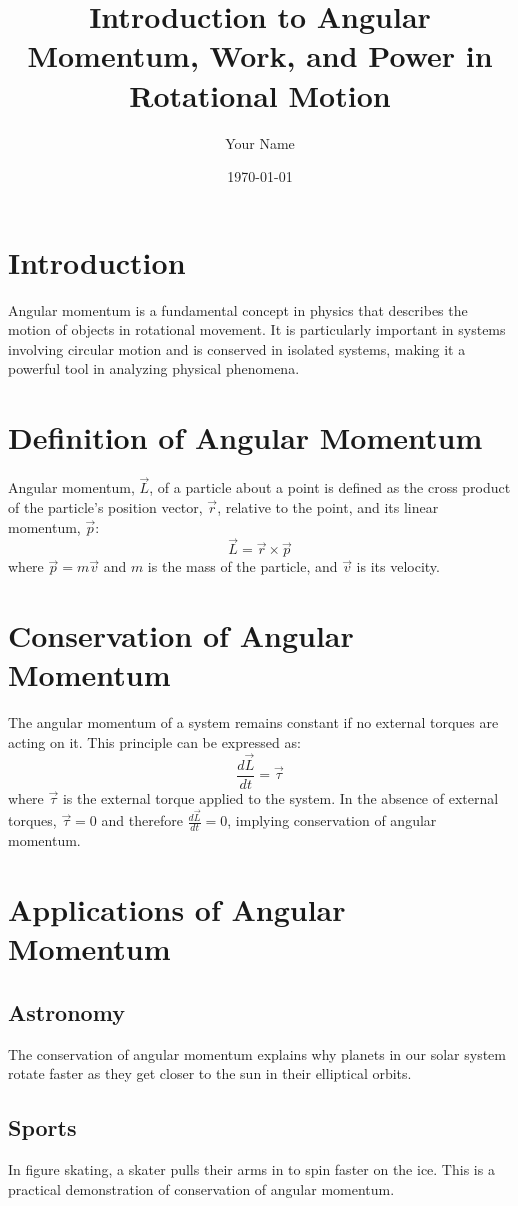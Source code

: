 \documentclass[12pt]{article}
\title{Introduction to Angular Momentum, Work, and Power in Rotational Motion}
\author{Your Name}
\date{\today}
\begin{document}
\maketitle

\section{Introduction}
Angular momentum is a fundamental concept in physics that describes the motion of objects in rotational movement. It is particularly important in systems involving circular motion and is conserved in isolated systems, making it a powerful tool in analyzing physical phenomena.

\section{Definition of Angular Momentum}
Angular momentum, \(\vec{L}\), of a particle about a point is defined as the cross product of the particle's position vector, \(\vec{r}\), relative to the point, and its linear momentum, \(\vec{p}\):
\[
\vec{L} = \vec{r} \times \vec{p}
\]
where \(\vec{p} = m\vec{v}\) and \(m\) is the mass of the particle, and \(\vec{v}\) is its velocity.

\section{Conservation of Angular Momentum}
The angular momentum of a system remains constant if no external torques are acting on it. This principle can be expressed as:
\[
\frac{d\vec{L}}{dt} = \vec{\tau}
\]
where \(\vec{\tau}\) is the external torque applied to the system. In the absence of external torques, \(\vec{\tau} = 0\) and therefore \(\frac{d\vec{L}}{dt} = 0\), implying conservation of angular momentum.

\section{Applications of Angular Momentum}
\subsection{Astronomy}
The conservation of angular momentum explains why planets in our solar system rotate faster as they get closer to the sun in their elliptical orbits.
\subsection{Sports}
In figure skating, a skater pulls their arms in to spin faster on the ice. This is a practical demonstration of conservation of angular momentum.
\end{document}

